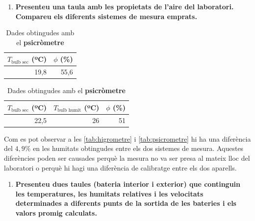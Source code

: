 \documentclass[a4paper]{article}
\newenvironment{questionenum}{%
	\setlist[enumerate]{resume}
	\restartlist{enumerate}
	\newcommand{\question}[1]{
		\begin{enumerate}
			\item\bfseries ##1
		\end{enumerate}
}}{%
}
\begin{document}
\begin{questionenum}
	\question{Presenteu una taula amb les propietats de l'aire del laboratori. Compareu els diferents sistemes de mesura emprats.}
	
	\begin{table}[H]
		\centering
		\begin{minipage}[t]{0.48\textwidth}
			\centering
			\begin{tabular}{rr}
				$T_{\text{bulb sec}}$ (ºC) & $\phi$ (\%) \\
				\hline
				19,8 & 55,6 
			\end{tabular}
			\caption{Dades obtingudes amb l'\textbf{higròmetre}}
			\label{tab:higrometre}
		\end{minipage}
		\hfill
		\begin{minipage}[t]{0.48\textwidth}
			\centering
			\begin{tabular}{rrr}
				$T_{\text{bulb sec}}$ (ºC) & $T_{\text{bulb humit}}$ (ºC) & $\phi$ (\%) \\
				\hline
				22,5 & 26 & 51
			\end{tabular}
			\caption{Dades obtingudes amb el \textbf{psicròmetre}}
			\label{tab:psicrometre}
		\end{minipage}
	\end{table}

	Com es pot observar a les \autoref{tab:higrometre} i \autoref{tab:psicrometre} hi ha una diferència del $4,9\%$ en les humitats obtingudes entre els dos sistemes de mesura. Aquestes diferències poden ser causades perquè la mesura no va ser presa al mateix lloc del laboratori o perquè hi hagi una diferència de calibratge entre els dos aparells.
	
	\question{Presenteu dues taules (bateria interior i exterior) que continguin les temperatures, les humitats relatives i les velocitats determinades a diferents punts de la sortida de les bateries i els valors promig calculats.}
	

\end{questionenum}
\end{document}
